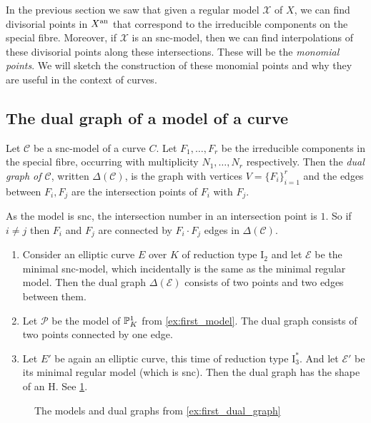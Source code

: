 In the previous section we saw that given a regular model $\mathscr X$ of $X$, we can find divisorial points in $X{}^{\text{an}}$ that correspond to the irreducible components on the special fibre.  
Moreover, if $\mathscr X$ is an snc-model, then we can find interpolations of these divisorial points along these intersections. 
These will be the \emph{monomial points}. 
We will sketch the construction of these monomial points and why they are useful in the context of curves. 

\subsection{The dual graph of a model of a curve} \label{sec:the_dual_graph_of_a_model_of_a_curve}
\begin{definition}
	Let $\mathscr C$ be a snc-model of a curve $C$.
	Let $F_1, \ldots, F_r$ be the irreducible components in the special fibre, occurring with multiplicity $N_1, \ldots, N_r$ respectively. 
	Then the \emph{dual graph of $\mathscr C$}, written $\Delta(\mathscr C)$, is the graph with vertices $V = \{F_i\}_{i = 1}^{r} $ and the edges between $F_i, F_j$ are the intersection points of $F_i$ with $F_j$. 
\end{definition}
As the model is snc, the intersection number in an intersection point is  $1$. 
So if $i \ne j$ then $F_i$ and $F_j$ are connected by $F_i \cdot F_j$ edges in $\Delta(\mathscr C)$. 
\begin{example}\label{ex:first_dual_graph}
	\begin{enumerate}
		\item Consider an elliptic curve $E$ over $K$ of reduction type $\mathrm I_2$ and let $\mathscr E$ be the minimal snc-model, which incidentally is the same as the minimal regular model. 
			Then the dual graph $\Delta(\mathscr E)$ consists of two points and two edges between them.
		\item Let $\mathscr P$ be the model of $\mathbb{P}_K^{1}$ from \cref{ex:first_model}. 
			The dual graph consists of two points connected by one edge.  
		\item Let $E'$ be again an elliptic curve, this time of reduction type $\mathrm I_3^*$. 
			And let $\mathscr E'$ be its minimal regular model (which is snc). 
			Then the dual graph has the shape of an H. See \cref{fig:example_dual_graph}.

	\end{enumerate}
\end{example}

\begin{figure}[h]
    \centering
    \caption{The models and dual graphs from \cref{ex:first_dual_graph}}
    \label{fig:example_dual_graph}
\end{figure}


